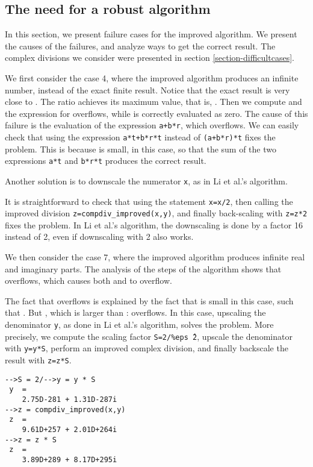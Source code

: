 \documentclass{paper}
\newcommand{\scivar}[1]{\texttt{#1}}
\begin{document}
\subsection{The need for a robust algorithm}
\label{section-needforrobust}

In this section, we present failure cases for the improved algorithm. 
We present the causes of the failures, and analyze ways to get the 
correct result. 
The complex divisions we consider were presented in section \ref{section-difficultcases}. 

We first consider the case 4, where the improved algorithm produces an 
infinite number, instead of the exact finite result. 
Notice that the exact result  is very close to .
The ratio  achieves its maximum value, that is, . 
Then we compute  and the expression for  overflows, while 
 is correctly evaluated as zero. 
The cause of this failure is the evaluation of the 
expression \scivar{a+b*r}, which overflows.
We can easily check that using the expression 
\scivar{a*t+b*r*t} instead of \scivar{(a+b*r)*t} fixes the problem. 
This is because  is small, in this case, so that the sum of the 
two expressions \scivar{a*t} and \scivar{b*r*t} produces the correct 
result.

Another solution is to downscale the numerator \scivar{x}, 
as in Li et al.'s algorithm. 

It is straightforward to check that using the statement \scivar{x=x/2}, 
then calling the improved division \scivar{z=compdiv\_improved(x,y)}, 
and finally back-scaling with \scivar{z=z*2} fixes the problem.
In Li et al.'s algorithm, the downscaling is done by a factor 16 instead 
of 2, even if downscaling with 2 also works.

We then consider the case 7, where the improved algorithm 
produces infinite real and imaginary parts.
The analysis of the steps of the algorithm shows that  overflows, which causes 
both  and  to overflow. 

The fact that  overflows is explained by the fact that 
 is small in this case, such that . 
But , which is larger than :  overflows. 
In this case, upscaling the denominator \scivar{y}, 
as done in Li et al.'s algorithm, solves the problem. 
More precisely, we compute the scaling factor \scivar{S=2/\%eps\^{\,}2}, 
upscale the denominator with \scivar{y=y*S}, 
perform an improved complex division, and finally backscale the 
result with \scivar{z=z*S}.
\lstset{language=scilabscript}
\begin{lstlisting}
-->S = 2/-->y = y * S
 y  =
    2.75D-281 + 1.31D-287i  
-->z = compdiv_improved(x,y)
 z  =
    9.61D+257 + 2.01D+264i  
-->z = z * S
 z  =
    3.89D+289 + 8.17D+295i  
\end{lstlisting}
\end{document}
